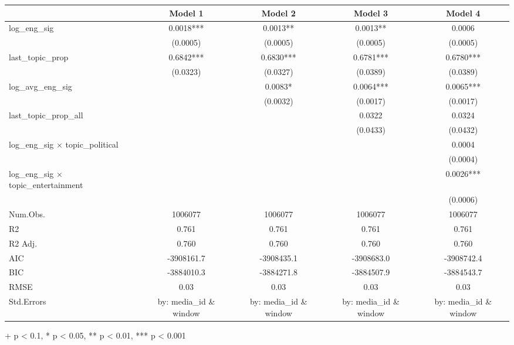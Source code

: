 \setlength{\LTpost}{0mm}
\begin{longtable}{lcccc}
\toprule
  & Model 1 & Model 2 & Model 3 & Model 4 \\ 
\midrule
log\_eng\_sig & 0.0018*** & 0.0013** & 0.0013** & 0.0006 \\ 
 & (0.0005) & (0.0005) & (0.0005) & (0.0005) \\ 
last\_topic\_prop & 0.6842*** & 0.6830*** & 0.6781*** & 0.6780*** \\ 
 & (0.0323) & (0.0327) & (0.0389) & (0.0389) \\ 
log\_avg\_eng\_sig &  & 0.0083* & 0.0064*** & 0.0065*** \\ 
 &  & (0.0032) & (0.0017) & (0.0017) \\ 
last\_topic\_prop\_all &  &  & 0.0322 & 0.0324 \\ 
 &  &  & (0.0433) & (0.0432) \\ 
log\_eng\_sig × topic\_political &  &  &  & 0.0004 \\ 
 &  &  &  & (0.0004) \\ 
log\_eng\_sig × topic\_entertainment &  &  &  & 0.0026*** \\ 
 &  &  &  & (0.0006) \\ 
Num.Obs. & 1006077 & 1006077 & 1006077 & 1006077 \\ 
R2 & 0.761 & 0.761 & 0.761 & 0.761 \\ 
R2 Adj. & 0.760 & 0.760 & 0.760 & 0.760 \\ 
AIC & -3908161.7 & -3908435.1 & -3908683.0 & -3908742.4 \\ 
BIC & -3884010.3 & -3884271.8 & -3884507.9 & -3884543.7 \\ 
RMSE & 0.03 & 0.03 & 0.03 & 0.03 \\ 
Std.Errors & by: media\_id \& window & by: media\_id \& window & by: media\_id \& window & by: media\_id \& window \\ 
\bottomrule
\end{longtable}
\begin{minipage}{\linewidth}
+ p < 0.1, * p < 0.05, ** p < 0.01, *** p < 0.001\\
\end{minipage}

